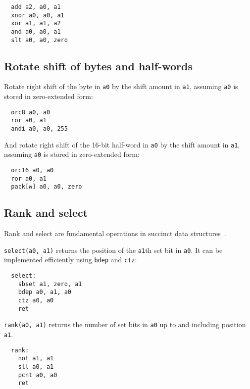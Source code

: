 \begin{verbatim}
  add a2, a0, a1
  xnor a0, a0, a1
  xor a1, a1, a2
  and a0, a0, a1
  slt a0, a0, zero
\end{verbatim}


\subsection{Rotate shift of bytes and half-words}

Rotate right shift of the byte in {\tt a0} by the shift amount in {\tt a1},
assuming {\tt a0} is stored in zero-extended form:

\begin{verbatim}
  orc8 a0, a0
  ror a0, a1
  andi a0, a0, 255
\end{verbatim}

And rotate right shift of the 16-bit half-word in {\tt a0} by the shift amount in {\tt a1},
assuming {\tt a0} is stored in zero-extended form:

\begin{verbatim}
  orc16 a0, a0
  ror a0, a1
  pack[w] a0, a0, zero
\end{verbatim}


\subsection{Rank and select}

Rank and select are fundamental operations in succinct data structures~\cite{SelectX86}.

\texttt{select(a0, a1)} returns the position of the \texttt{a1}th set bit in \texttt{a0}.
It can be implemented efficiently using \texttt{bdep} and \texttt{ctz}:

\begin{minipage}{\linewidth}
\begin{verbatim}
  select:
    sbset a1, zero, a1
    bdep a0, a1, a0
    ctz a0, a0
    ret
\end{verbatim}
\end{minipage}

\texttt{rank(a0, a1)} returns the number of set bits in \texttt{a0} up to and
including position \texttt{a1}.

\begin{minipage}{\linewidth}
\begin{verbatim}
  rank:
    not a1, a1
    sll a0, a1
    pcnt a0, a0
    ret
\end{verbatim}
\end{minipage}

